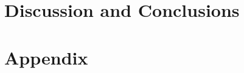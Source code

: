 \documentclass[a4paper,11pt]{article}
\begin{document}
\section{Discussion and Conclusions}




\section{Appendix}
\end{document}
